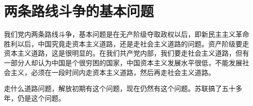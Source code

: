 \section[两条路线斗争的基本问题（一九六七年三月）]{两条路线斗争的基本问题}


我们党内两条路线斗争，基本问题是在无产阶级夺取政权以后，即新民主主义革命胜利以后，中国究竟走资本主义道路，还是走社会主义道路的问题。资产阶级要走资本主义道路，这是很明显的。在我们共产党内部，我们要走社会主义道路，但有一部分人却认为中国是个很穷困的国家，中国资本主义发展水平很低，不能发展社会主义，必须在一段时间内走资本主义道路，然后再走社会主义道路。

走什么道路问题，解放初期有这个问题，现在仍然有这个问题。苏联搞了五十多年，仍是这个问题。



